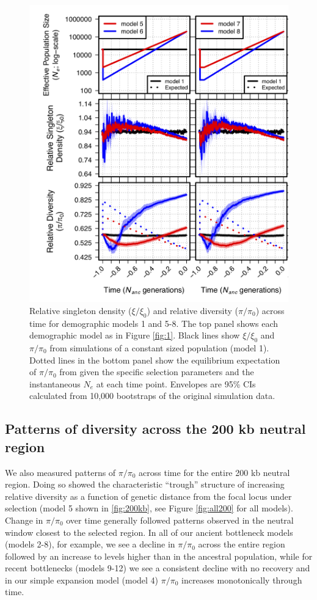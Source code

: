 \documentclass[9pt,twocolumn,twoside]{rilabRxiv}
\begin{document}
\begin{figure}[]
\includegraphics[width=\linewidth]{figures/fig3new.png}
\caption{Relative singleton density ($\xi/\xi_0$) and relative diversity ($\pi/\pi_0$) across time for demographic models 1 and 5-8.
The top panel shows each demographic model as in Figure \ref{fig:1}.
Black lines show $\xi/\xi_0$ and $\pi/\pi_0$ from simulations of a constant sized population (model 1).
Dotted lines in the bottom panel show the equilibrium  expectation of $\pi/\pi_0$ from  \citet{nordborg1996effect} given the specific selection parameters and the instantaneous $N_e$ at each time point.
Envelopes are 95\% CIs calculated from 10,000 bootstraps of the original simulation data.}
\label{fig:3new}
\end{figure}

\subsection{Patterns of diversity across the 200 kb neutral region}

We also measured patterns of $\pi/\pi_0$ across time for the entire 200 kb neutral region.
Doing so showed the characteristic ``trough'' structure of increasing relative diversity as a function of genetic distance from the focal locus under selection (model 5 shown in  \ref{fig:200kb}, see Figure \ref{fig:all200} for all models).
Change in $\pi/\pi_0$ over time generally followed patterns observed in the neutral window closest to the selected region.
In all of our ancient bottleneck models (models 2-8), for example, we see a decline in $\pi/\pi_0$ across the entire region followed by an increase to levels higher than in the ancestral population, while for recent bottlenecks (models 9-12) we see a consistent decline with no recovery and in our simple expansion model (model 4) $\pi/\pi_0$ increases monotonically through time.
\end{document}
